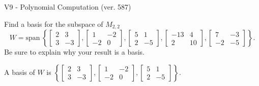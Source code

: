 \begin{exercise}
  \begin{exerciseTitle}V9 - Polynomial Computation (ver. 587)\end{exerciseTitle}
  \begin{exerciseStatement}
    Find a basis for the subspace of \(M_{2,2}\) 
\[W=\mathrm{span}\ \left\{\left[\begin{array}{cc}
2 & 3 \\
3 & -3
\end{array}\right] , \left[\begin{array}{cc}
1 & -2 \\
-2 & 0
\end{array}\right] , \left[\begin{array}{cc}
5 & 1 \\
2 & -5
\end{array}\right] , \left[\begin{array}{cc}
-13 & 4 \\
2 & 10
\end{array}\right] , \left[\begin{array}{cc}
7 & -3 \\
-2 & -5
\end{array}\right]\right\}.\]
 Be sure to explain why your result is a basis.


  \end{exerciseStatement}
  \begin{exerciseAnswer}
   A basis of \(W\) is  \(\left\{\left[\begin{array}{cc}
2 & 3 \\
3 & -3
\end{array}\right] , \left[\begin{array}{cc}
1 & -2 \\
-2 & 0
\end{array}\right] , \left[\begin{array}{cc}
5 & 1 \\
2 & -5
\end{array}\right]\right\}\).
  


  \end{exerciseAnswer}
\end{exercise}